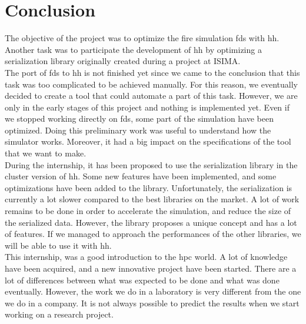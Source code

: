 
\newpage
\section*{Conclusion}

The objective of the project was to optimize the fire simulation \gls{fds} with
\gls{hh}. Another task was to participate the development of \gls{hh} by
optimizing a serialization library originally created during a project at
ISIMA.\\

The port of \gls{fds} to \gls{hh} is not finished yet since we came to the
conclusion that this task was too complicated to be achieved manually. For this
reason, we eventually decided to create a tool that could automate a part of
this task. However, we are only in the early stages of this project and nothing
is implemented yet. Even if we stopped working directly on \gls{fds}, some part
of the simulation have been optimized. Doing this preliminary work was useful to
understand how the simulator works. Moreover, it had a big impact on the
specifications of the tool that we want to make.\\

During the internship, it has been proposed to use the serialization library in
the cluster version of \gls{hh}. Some new features have been implemented, and
some optimizations have been added to the library. Unfortunately, the
serialization is currently a lot slower compared to the best libraries on the
market. A lot of work remains to be done in order to accelerate the simulation,
and reduce the size of the serialized data. However, the library proposes a
unique concept and has a lot of features. If we managed to approach the
performances of the other libraries, we will be able to use it with \gls{hh}.\\

This internship, was a good introduction to the \gls{hpc} world. A lot of
knowledge have been acquired, and a new innovative project have been started.
There are a lot of differences between what was expected to be done and what was
done eventually. However, the work we do in a laboratory is very different from
the one we do in a company. It is not always possible to predict the results
when we start working on a research project.

\label{lastPage}
\newpage
\pagestyle{empty}

